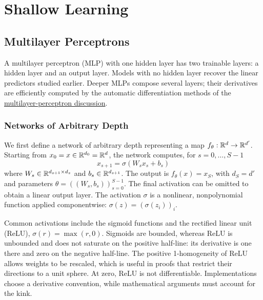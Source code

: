 
\chapter{Shallow Learning}
\label{c-shallow-learning}



\section{Multilayer Perceptrons}

A multilayer perceptron (MLP) with one hidden layer has two trainable layers: a hidden layer and an output layer. Models with no hidden layer recover the linear predictors studied earlier. Deeper MLPs compose several layers; their derivatives are efficiently computed by the automatic differentiation methods of the \hyperref[sec-autodiff-mlp]{multilayer-perceptron discussion}.

\subsection{Networks of Arbitrary Depth}

We first define a network of arbitrary depth representing a map $f_\theta : \mathbb{R}^d \to \mathbb{R}^{d'}$.
%
Starting from $x_0=x\in\mathbb{R}^{d_0}=\mathbb{R}^d$, the network computes, for $s=0,\ldots,S-1$
$$
	x_{s+1}=\sigma( W_s x_s + b_s )
$$
where $W_s \in \mathbb{R}^{d_{s+1} \times d_s}$ and $b_s \in \mathbb{R}^{d_{s+1}}$. The output is $f_\theta(x)=x_S$, with $d_S=d'$ and parameters $\theta=((W_s,b_s))_{s=0}^{S-1}$. The final activation can be omitted to obtain a linear output layer.
%
The activation $\sigma$ is a nonlinear, nonpolynomial function applied componentwise: $\sigma(z) = (\sigma(z_i))_i$.

Common activations include the sigmoid functions
and the rectified linear unit (ReLU), $\sigma(r)=\max(r,0)$. Sigmoids are bounded, whereas ReLU is unbounded and does not saturate on the positive half-line: its derivative is one there and zero on the negative half-line. The positive 1-homogeneity of ReLU allows weights to be rescaled, which is useful in proofs that restrict their directions to a unit sphere. At zero, ReLU is not differentiable. Implementations choose a derivative convention, while mathematical arguments must account for the kink.


